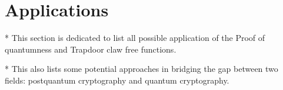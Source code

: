 \section{Applications}
* This section is dedicated to list all possible application of the Proof of quantumness and Trapdoor claw free functions.

* This also lists some potential approaches in bridging the gap between two fields: postquantum cryptography and quantum cryptography.